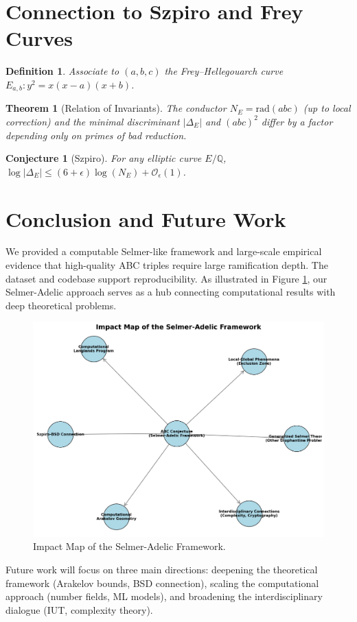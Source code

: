 \documentclass[11pt,a4paper]{article}
\newtheorem{definition}{Definition}[section]
\newtheorem{conjecture}{Conjecture}[section]
\newtheorem{theorem}{Theorem}[section]
\newcommand{\Q}{\mathbb{Q}}
\newcommand{\rad}{\mathrm{rad}}
\begin{document}
\section{Connection to Szpiro and Frey Curves}
\begin{definition}
Associate to $(a,b,c)$ the Frey--Hellegouarch curve $E_{a,b}: y^2 = x(x-a)(x+b)$.
\end{definition}
\begin{theorem}[Relation of Invariants]
The conductor $N_E=\rad(abc)$ (up to local correction) and the minimal discriminant $|\Delta_E|$ and $(abc)^2$ differ by a factor depending only on primes of bad reduction.
\end{theorem}
\begin{conjecture}[Szpiro]
For any elliptic curve $E/\Q$, $\log|\Delta_E| \le (6+\epsilon)\log(N_E) + \mathcal{O}_\epsilon(1)$.
\end{conjecture}

\section{Conclusion and Future Work}
We provided a computable Selmer-like framework and large-scale empirical evidence that high-quality ABC triples require large ramification depth. The dataset and codebase support reproducibility. As illustrated in Figure \ref{fig:impact_map}, our Selmer-Adelic approach serves as a hub connecting computational results with deep theoretical problems.
\begin{figure}[h!]
    \centering
    \includegraphics[width=\textwidth]{../figures/impact_map.png}
    \caption{Impact Map of the Selmer-Adelic Framework.}
    \label{fig:impact_map}
\end{figure}
Future work will focus on three main directions: deepening the theoretical framework (Arakelov bounds, BSD connection), scaling the computational approach (number fields, ML models), and broadening the interdisciplinary dialogue (IUT, complexity theory).
\end{document}
